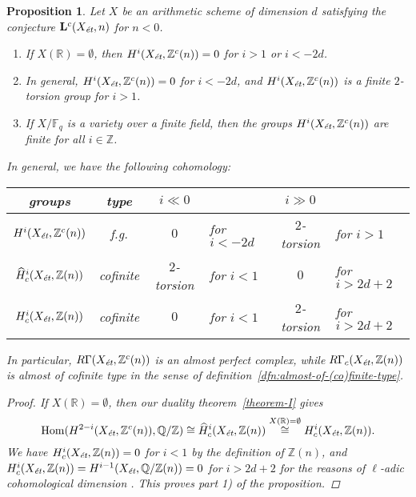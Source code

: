 \documentclass[leqno,12pt]{article}
\theoremstyle{plain}
\newtheorem{proposition}[theorem]{\indent\sc Proposition}
\theoremstyle{definition}
\DeclareMathOperator{\Hom}{Hom}
\newcommand{\FF}{\mathbb{F}}
\newcommand{\QQ}{\mathbb{Q}}
\newcommand{\RR}{\mathbb{R}}
\newcommand{\ZZ}{\mathbb{Z}}
\newcommand{\et}{\text{\it \'{e}t}}
\begin{document}
\begin{proposition}
  \label{prop:motivic-cohomology-duality-consequences}
  Let $X$ be an arithmetic scheme of dimension $d$ satisfying the conjecture
  $\mathbf{L}^c (X_\et,n)$ for $n < 0$.

  \begin{enumerate}
  \item[$1)$] If $X (\RR) = \emptyset$, then $H^i (X_\et, \ZZ^c (n)) = 0$ for
    $i > 1$ or $i < -2d$.

  \item[$2)$] In general, $H^i (X_\et, \ZZ^c (n)) = 0$ for $i < -2d$, and
    $H^i (X_\et, \ZZ^c (n))$ is a finite $2$-torsion group for $i > 1$.

  \item[$3)$] If $X/\FF_q$ is a variety over a finite field, then the groups
    $H^i (X_\et, \ZZ^c(n))$ are finite for all $i \in \ZZ$.
  \end{enumerate}

  In general, we have the following cohomology:
  \begin{center}
    \renewcommand{\arraystretch}{1.5}
    \begin{tabular}{ccclcl}
      \hline
      \textbf{groups} & \textbf{type} & $i \ll 0$ & & $i \gg 0$ \\
      \hline
      $H^i (X_\et, \ZZ^c (n))$ & f.g. & $0$ & for $i < -2d$ & $2$-torsion & for $i > 1$ \\
      $\widehat{H}^i_c (X_\et, \ZZ (n))$ & cofinite & $2$-torsion & for $i < 1$ & $0$ & for $i > 2d + 2$ \\
      $H^i_c (X_\et, \ZZ (n))$ & cofinite & $0$ & for $i < 1$ & $2$-torsion & for $i > 2d + 2$ \\
      \hline
    \end{tabular}
  \end{center}
  In particular, $R\Gamma (X_\et, \ZZ^c (n))$ is an almost perfect complex,
  while $R\Gamma_c (X_\et, \ZZ (n))$ is almost of cofinite type in the sense of
  definition~{\rm\ref{dfn:almost-of-(co)finite-type}}.

  \begin{proof}
    If $X (\RR) = \emptyset$, then our duality theorem~\ref{theorem-I} gives
    \[ \Hom (H^{2-i} (X_\et, \ZZ^c (n)), \QQ/\ZZ) \cong
      \widehat{H}^i_c (X_\et, \ZZ (n)) \stackrel{X(\RR)=\emptyset}{\cong}
      H^i_c (X_\et, \ZZ (n)). \]
    We have $H^i_c (X_\et, \ZZ (n)) = 0$ for $i < 1$ by the definition of
    $\ZZ (n)$, and $H^i_c (X_\et, \ZZ (n)) = H^{i-1} (X_\et, \QQ/\ZZ(n)) = 0$
    for $i > 2d + 2$ for the reasons of $\ell$-adic cohomological dimension
    \cite[Expos\'{e}~X, Th\'{e}or\`{e}me~6.2]{SGA4}. This proves part 1) of the proposition.


\end{proof}
\end{proposition}
\end{document}
